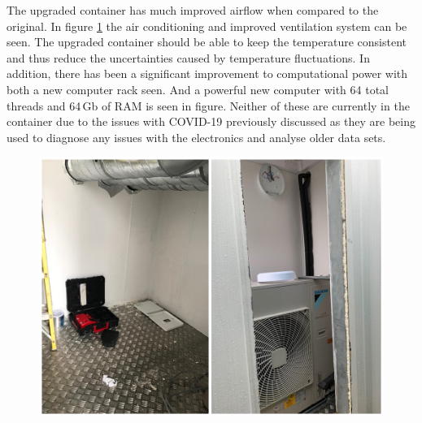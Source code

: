 The upgraded container has much improved airflow when compared to the original. 
In figure  \ref{fig:detCon035b_ContainerAirCon} the air conditioning and improved ventilation system can be seen. The upgraded container should be able to keep the temperature consistent and thus reduce the uncertainties caused by temperature fluctuations. In addition, there has been a significant improvement to computational power with both a new computer rack seen. And a powerful new computer with 64 total threads and 64\,Gb of RAM is seen in figure. Neither of these are currently in the container due to the issues with COVID-19 previously discussed as they are being used to diagnose any issues with the electronics and analyse older data sets.  

\begin{figure}[!h]
\centering
\includegraphics[width=0.7\linewidth]{Chapter3/Figs/Raster/detCon035b_ContainerAirCon.png}
\label{fig:detCon035b_ContainerAirCon}
\end{figure}



